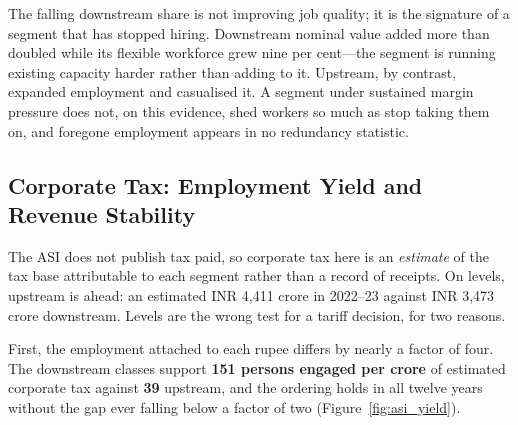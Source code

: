 \documentclass[11pt, a4paper]{article}
\numberwithin{figure}{section}
\numberwithin{table}{section}
\begin{document}
The falling downstream share is not improving job quality; it is the signature of a segment that has stopped hiring. Downstream nominal value added more than doubled while its flexible workforce grew nine per cent---the segment is running existing capacity harder rather than adding to it. Upstream, by contrast, expanded employment and casualised it. A segment under sustained margin pressure does not, on this evidence, shed workers so much as stop taking them on, and foregone employment appears in no redundancy statistic.

\subsection{Corporate Tax: Employment Yield and Revenue Stability}

The ASI does not publish tax paid, so corporate tax here is an \emph{estimate} of the tax base attributable to each segment rather than a record of receipts. On levels, upstream is ahead: an estimated INR 4,411 crore in 2022--23 against INR 3,473 crore downstream. Levels are the wrong test for a tariff decision, for two reasons.

First, the employment attached to each rupee differs by nearly a factor of four. The downstream classes support \textbf{151 persons engaged per crore} of estimated corporate tax against \textbf{39} upstream, and the ordering holds in all twelve years without the gap ever falling below a factor of two (Figure~\ref{fig:asi_yield}).
\end{document}
